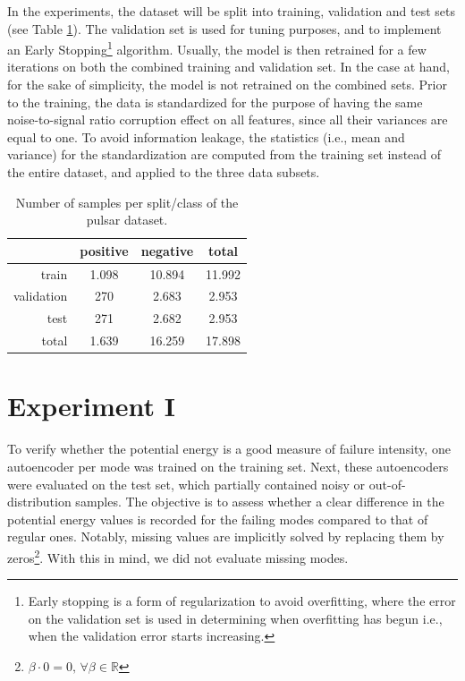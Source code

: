 In the experiments, the dataset will be split into training, validation and test sets (see Table \ref{tab:split}). The validation set is used for tuning purposes, and to implement an Early Stopping\footnote{Early stopping \citep{early-stopping} is a form of regularization to avoid overfitting, where the error on the validation set is used in determining when overfitting has begun i.e., when the validation error starts increasing.} algorithm. Usually, the model is then retrained for a few iterations on both the combined training and validation set. In the case at hand, for the sake of simplicity, the model is not retrained on the combined sets. Prior to the training, the data is standardized for the purpose of having the same noise-to-signal ratio corruption effect on all features, since all their variances are equal to one. To avoid information leakage, the statistics (i.e., mean and variance) for the standardization are computed from the training set instead of the entire dataset, and applied to the three data subsets. 
\begin{table}
\centering
\begin{tabular}{ r|cc|c } 
  & positive & negative & total \\ 
 \hline \hline
 train & 1.098 & 10.894 & 11.992 \\
 validation & 270 & 2.683 & 2.953 \\  
 test & 271 & 2.682 & 2.953 \\ 
 \hline
 total & 1.639 & 16.259 & 17.898 \\ 
 \hline
\end{tabular}
 \caption{Number of samples per split/class of the pulsar dataset.}
\label{tab:split}
\end{table}


\section{Experiment I}\label{sec:expII}
To verify whether the potential energy is a good measure of failure intensity, one autoencoder per mode was trained on the training set. Next, these autoencoders were evaluated on the test set, which partially contained noisy or out-of-distribution samples. The objective is to assess whether a clear difference in the potential energy values is recorded for the failing modes compared to that of regular ones. Notably, missing values are implicitly solved by replacing them by zeros\footnote{$\beta\cdot 0 = 0,\,\forall \beta \in \mathbb{R}$}. With this in mind, we did not evaluate missing modes. 

